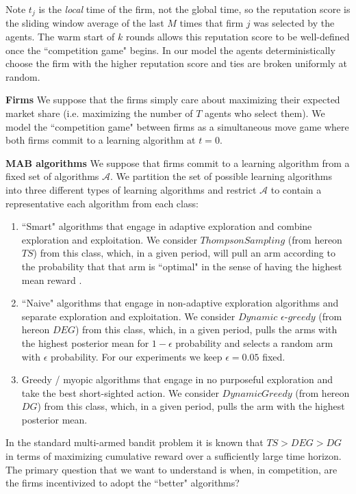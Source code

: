 \documentclass{article}
\theoremstyle{definition}
\begin{document}
Note $t_j$ is the \textit{local} time of the firm, not the global time, so the reputation score is the sliding window average of the last $M$ times that firm $j$ was selected by the agents. The warm start of $k$ rounds allows this reputation score to be well-defined once the ``competition game" begins. In our model the agents deterministically choose the firm with the higher reputation score and ties are broken uniformly at random.

\noindent \textbf{Firms} We suppose that the firms simply care about maximizing their expected market share (i.e. maximizing the number of $T$ agents who select them). We model the ``competition game" between firms as a simultaneous move game where both firms commit to a learning algorithm at $t = 0$.

\noindent \textbf{MAB algorithms} We suppose that firms commit to a learning algorithm from a fixed set of algorithms $\mathcal{A}$. We partition the set of possible learning algorithms into three different types of learning algorithms and restrict $\mathcal{A}$ to contain a representative each algorithm from each class:
\begin{enumerate}
\item ``Smart" algorithms that engage in adaptive exploration and combine exploration and exploitation. We consider $Thompson Sampling$ (from hereon $TS$) from this class, which, in a given period, will pull an arm according to the probability that that arm is ``optimal" in the sense of having the highest mean reward \citep{agrawal2012analysis}.
\item ``Naive" algorithms that engage in non-adaptive exploration algorithms and separate exploration and exploitation. We consider $Dynamic$ $\epsilon$-$greedy$ (from hereon $DEG$) from this class, which, in a given period, pulls the arms with the highest posterior mean for $1 - \epsilon$ probability and selects a random arm with $\epsilon$ probability. For our experiments we keep $\epsilon = 0.05$ fixed.
\item Greedy / myopic algorithms that engage in no purposeful exploration and take the best short-sighted action. We consider $DynamicGreedy$ (from hereon $DG$) from this class, which, in a given period, pulls the arm with the highest posterior mean.
\end{enumerate}

In the standard multi-armed bandit problem it is known that $TS > DEG > DG$ in terms of maximizing cumulative reward over a sufficiently large time horizon. The primary question that we want to understand is when, in competition, are the firms incentivized to adopt the ``better" algorithms?
\end{document}
